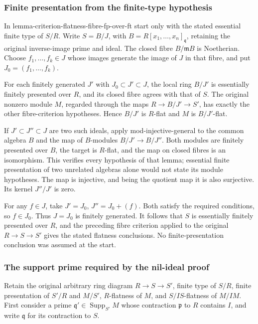 \subsubsection{Finite presentation from the finite-type hypothesis}\label{finite-presentation-from-the-finite-type-hypothesis}

In lemma-criterion-flatness-fibre-fp-over-ft start only with the stated essential finite type of \(S/R\). Write \(S=B/J\), with \(B=R[x_1,\ldots,x_n]_{\mathfrak q}\), retaining the original inverse-image prime and ideal. The closed fibre \(B/\mathfrak mB\) is Noetherian. Choose \(f_1,\ldots,f_k\in J\) whose images generate the image of \(J\) in that fibre, and put \(J_0=(f_1,\ldots,f_k)\).

For each finitely generated \(J'\) with \(J_0\subset J'\subset J\), the local ring \(B/J'\) is essentially finitely presented over \(R\), and its closed fibre agrees with that of \(S\). The original nonzero module \(M\), regarded through the maps \(R\to B/J'\to S'\), has exactly the other fibre-criterion hypotheses. Hence \(B/J'\) is \(R\)-flat and \(M\) is \(B/J'\)-flat.

If \(J'\subset J''\subset J\) are two such ideals, apply mod-injective-general to the common algebra \(B\) and the map of \(B\)-modules \(B/J'\to B/J''\). Both modules are finitely presented over \(B\), the target is \(R\)-flat, and the map on closed fibres is an isomorphism. This verifies every hypothesis of that lemma; essential finite presentation of two unrelated algebras alone would not state its module hypotheses. The map is injective, and being the quotient map it is also surjective. Its kernel \(J''/J'\) is zero.

For any \(f\in J\), take \(J'=J_0\), \(J''=J_0+(f)\). Both satisfy the required conditions, so \(f\in J_0\). Thus \(J=J_0\) is finitely generated. It follows that \(S\) is essentially finitely presented over \(R\), and the preceding fibre criterion applied to the original \(R\to S\to S'\) gives the stated flatness conclusions. No finite-presentation conclusion was assumed at the start.

\subsubsection{The support prime required by the nil-ideal proof}\label{the-support-prime-required-by-the-nil-ideal-proof}

Retain the original arbitrary ring diagram \(R\to S\to S'\), finite type of \(S/R\), finite presentation of \(S'/R\) and \(M/S'\), \(R\)-flatness of \(M\), and \(S/IS\)-flatness of \(M/IM\). First consider a prime \(\mathfrak q'\in\operatorname{Supp}_{S'}M\) whose contraction \(\mathfrak p\) to \(R\) contains \(I\), and write \(\mathfrak q\) for its contraction to \(S\).

